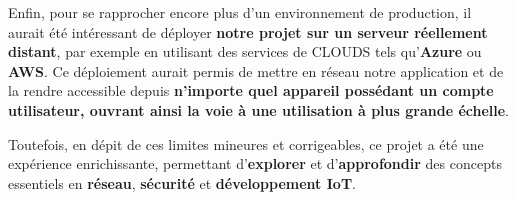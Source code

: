 \documentclass[10pt, a4paper]{report}
\begin{document}
	Enfin, pour se rapprocher encore plus d’un environnement de production, il aurait été intéressant de déployer \textbf{notre projet sur un serveur réellement distant}, par exemple en utilisant des services de CLOUDS tels qu’\textbf{Azure} ou \textbf{AWS}. Ce déploiement aurait permis de mettre en réseau notre application et de la rendre accessible depuis \textbf{n’importe quel appareil possédant un compte utilisateur, ouvrant ainsi la voie à une utilisation à plus grande échelle}. 
	
	Toutefois, en dépit de ces limites mineures et corrigeables, ce projet a été une expérience enrichissante, permettant d’\textbf{explorer} et d’\textbf{approfondir} des concepts essentiels en \textbf{réseau}, \textbf{sécurité} et \textbf{développement IoT}.	
	
	\appendix
	
	
	
	
		
	
	\nocite{*}
	
	
	
	\clearpage
	
	\printglossaries
	
	
\end{document}
